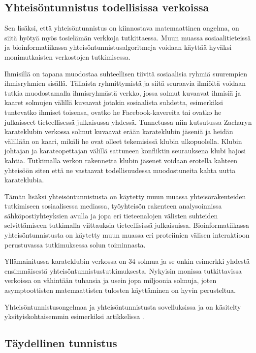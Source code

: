 \documentclass[finnish,12pt,a4paper,pdftex,sci,utf8]{aaltothesis}
\begin{document}
\subsection{Yhteisöntunnistus todellisissa verkoissa}

Sen lisäksi, että yhteisöntunnistus on kiinnostava matemaattinen ongelma, on siitä hyötyä myös tosielämän verkkoja tutkittaessa. Muun muassa sosiaalitieteissä ja bioinformatiikassa yhteisöntunnistusalgoritmeja voidaan käyttää hyväksi monimutkaisten verkostojen tutkimisessa.

Ihmisillä on tapana muodostaa suhteellisen tiivitä sosiaalisia ryhmiä suurempien ihmisryhmien sisällä. Tällaista ryhmittymistä ja siitä seuraavia ilmiöitä voidaan tutkia muodostamalla ihmisryhmästä verkko, jossa solmut kuvaavat ihmisiä ja kaaret solmujen välillä kuvaavat jotakin sosiaalista suhdetta, esimerkiksi tuntevatko ihmiset toisensa, ovatko he Facebook-kavereita tai ovatko he julkaisseet tieteellisessä julkaisussa yhdessä. Tunnetussa niin kutsutussa Zacharyn karateklubin verkossa solmut kuvaavat erään karateklubin jäseniä ja heidän välillään on kaari, mikäli he ovat olleet tekemisissä klubin ulkopuolella. Klubin johtajan ja karateopettajan välillä sattuneen konfliktin seurauksena klubi hajosi kahtia. Tutkimalla verkon rakennetta klubin jäsenet voidaan erotella kahteen yhteisöön siten että ne vastaavat todellisuudessa muodostuneita kahta uutta karateklubia.

Tämän lisäksi yhteisöntunnistusta on käytetty muun muassa yhteisörakenteiden tutkimiseen sosiaalisessa mediassa, työyhteisön rakenteen analysoinnissa sähköpostiyhteyksien avulla ja jopa eri tieteenalojen välisten suhteiden selvittämiseen tutkimalla viittauksia tieteellisissä julkaisuissa. Bioinformatiikassa yhteisöntunnistusta on käytetty muun muassa eri proteiinien välisen interaktioon perustuvassa tutkimuksessa solun toiminnasta.

Yllämainitussa karateklubin verkossa on 34 solmua ja se onkin esimerkki yhdestä ensimmäisestä yhteisöntunnistustutkimuksesta. Nykyisin monissa tutkittavissa verkoissa on vähintään tuhansia ja usein jopa miljoonia solmuja, joten asymptoottisten matemaattisten tulosten käyttäminen on hyvin perusteltua.

Yhteisöntunnistusongelmaa ja yhteisöntunnistusta sovelluksissa ja on käsitelty yksityiskohtaisemmin esimerkiksi artikkelissa \cite{Fortunato}.

\subsection{Täydellinen tunnistus}
\end{document}
